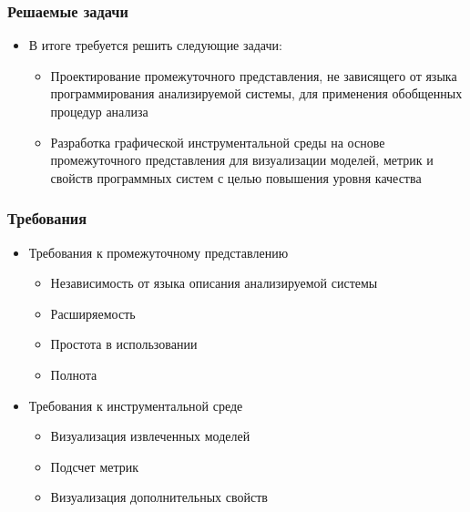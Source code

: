 \documentclass{beamer}
\begin{document}
\begin{frame}
\frametitle{Решаемые задачи}

\begin{itemize}
    \item В итоге требуется решить следующие задачи:
        \begin{itemize}
            \item Проектирование промежуточного представления, не зависящего от
            языка программирования анализируемой системы, для применения
            обобщенных процедур анализа
            \item Разработка графической инструментальной среды на основе
            промежуточного представления для визуализации моделей, метрик и
            свойств программных систем с целью повышения уровня качества
        \end{itemize}

\end{itemize}

\end{frame}
\begin{frame}
\frametitle{Требования}

\begin{itemize}
    \item Требования к промежуточному представлению
        \begin{itemize}
            \item Независимость от языка описания анализируемой системы
            \item Расширяемость
            \item Простота в использовании
            \item Полнота
        \end{itemize}
    \item Требования к инструментальной среде
        \begin{itemize}
            \item Визуализация извлеченных моделей
            \item Подсчет метрик
            \item Визуализация дополнительных свойств
        \end{itemize}
\end{itemize}

\end{frame}
\end{document}

